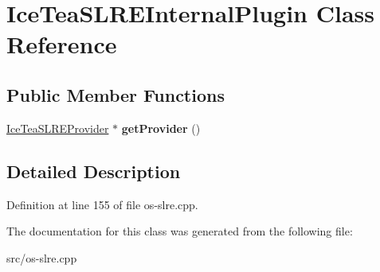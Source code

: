 \hypertarget{class_ice_tea_s_l_r_e_internal_plugin}{}\section{Ice\+Tea\+S\+L\+R\+E\+Internal\+Plugin Class Reference}
\label{class_ice_tea_s_l_r_e_internal_plugin}
\subsection*{Public Member Functions}
\begin{DoxyCompactItemize}
\item 
\hyperlink{class_ice_tea_s_l_r_e_provider}{Ice\+Tea\+S\+L\+R\+E\+Provider} $\ast$ {\bfseries get\+Provider} ()\hypertarget{class_ice_tea_s_l_r_e_internal_plugin_a36806c0334f52537f0e58b00470da6b3}{}\label{class_ice_tea_s_l_r_e_internal_plugin_a36806c0334f52537f0e58b00470da6b3}

\end{DoxyCompactItemize}


\subsection{Detailed Description}


Definition at line 155 of file os-\/slre.\+cpp.



The documentation for this class was generated from the following file\+:\begin{DoxyCompactItemize}
\item 
src/os-\/slre.\+cpp\end{DoxyCompactItemize}
